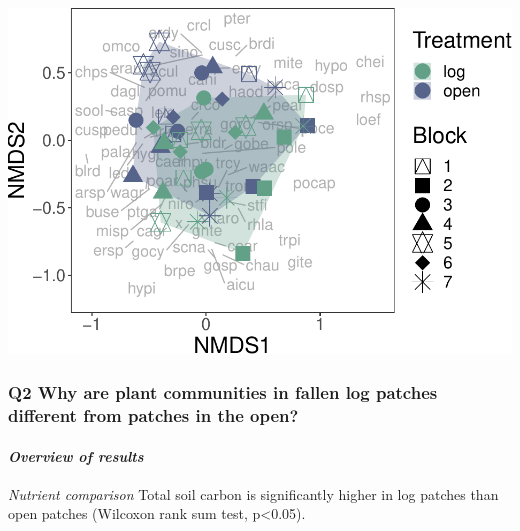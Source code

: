 \documentclass[
]{article}
\begin{document}
\includegraphics{log-project-aubrie-winnie_files/figure-latex/unnamed-chunk-7-3.pdf}

\hypertarget{q2-why-are-plant-communities-in-fallen-log-patches-different-from-patches-in-the-open}{%
\subsubsection{\texorpdfstring{\textbf{Q2 Why are plant communities in
fallen log patches different from patches in the
open?}}{Q2 Why are plant communities in fallen log patches different from patches in the open? }}\label{q2-why-are-plant-communities-in-fallen-log-patches-different-from-patches-in-the-open}}

\hypertarget{overview-of-results-1}{%
\paragraph{\texorpdfstring{\emph{Overview of results}
}{Overview of results  }}\label{overview-of-results-1}}

\emph{Nutrient comparison} Total soil carbon is significantly higher in
log patches than open patches (Wilcoxon rank sum test, p\textless0.05).
\end{document}
